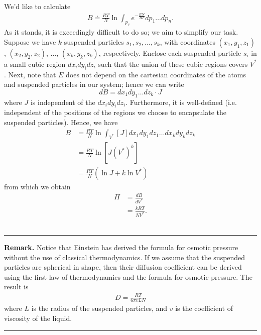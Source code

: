 \documentclass[12pt,reqno]{amsart}
\theoremstyle{plain}  %
\theoremstyle{definition}
\begin{document}
We'd like to calculate 
\begin{equation*}
	\begin{split}
		B \doteq \frac{RT}{N}\ln \int_{p_v} e^{-\frac{EN}{RT}}dp_1\dots dp_n.
		\label{B}
	\end{split}
\end{equation*}
As it stands, it is exceedingly
difficult to do so; we aim to simplify our task. Suppose we have $k$
suspended particles $s_1, s_2, \dots, s_k$, with coordinates $(x_1, y_1, z_1)$, $(x_2, y_2, z_2)$, $\dots$,
$(x_k, y_k, z_k)$, respectively. Enclose each suspended particle $s_i$ in a small cubic region $dx_i dy_i dz_i$ such that the union of these cubic regions covers $V^*$. Next, note
that $E$ does not depend on the cartesian coordinates of the atoms and suspended
particles in our system; hence we can write
\begin{equation*}
	dB = dx_1 dy_1\dots dz_k \cdot J
\end{equation*}
where $J$ is independent of the $dx_i dy_i dz_i$. Furthermore, it is well-defined (i.e.
independent of the positions of the regions we choose to encapsulate the suspended
particles). Hence, we have
\begin{equation*}
	\begin{split}
		B & = \frac{RT}{N} \ln
		\int_{V^*} \left[ J \right] dx_1dy_1dz_1\dots dx_k dy_k dz_k
		\\
		& = \frac{RT}{N} \ln \left[ J(V^*)^k \right]
		\\
		& = \frac{RT}{N}(\ln J + k \ln V^*)
		\label{simplified-B}
	\end{split}
\end{equation*}
from which we obtain
\begin{equation*}
	\begin{split}
		\Pi & = \frac{dB}{dV^*}
		\\
		& = \frac{kRT}{NV^*}.
		\label{pressure-from-molecular-heat}
	\end{split}
\end{equation*}
\\
\hrule
{\bf Remark.} Notice that Einstein has derived the formula for osmotic pressure
without the use of classical thermodynamics. If we assume that the suspended particles
are spherical in shape, then their diffusion coefficient can be derived using the first
law of thermodynamics and the formula for osmotic pressure. The result is 
\begin{equation}
	\begin{split}
		D = \frac{RT}{6 \pi v L N}
		\label{diffusion-coefficient}
	\end{split}
\end{equation}
where $L$ is the radius of the suspended particles, and $v$ is the coefficient of
viscosity of the liquid.
\\
\hrule
\end{document}
